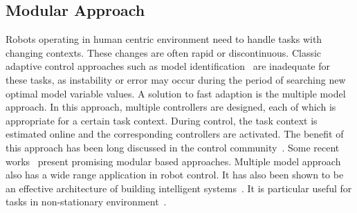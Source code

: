 \subsection{Modular Approach}



Robots operating in human centric environment need to handle tasks with changing contexts. These changes are often rapid or discontinuous. Classic adaptive control approaches such as model identification~\cite{khalil2004modeling} are inadequate for these tasks, as instability or error may occur during the period of searching new optimal model variable values. A solution to fast adaption is the multiple model approach. In this approach, multiple controllers are designed, each of which is appropriate for a certain task context. During control, the task context is estimated online and the corresponding controllers are activated. The benefit of this approach has been long discussed in the control community~\cite{jacobs1991adaptive,narendra1995adaptation,narendra1997adaptive}. Some recent works~\cite{fekri2007robust,kuipers2010multiple} present promising modular based approaches. Multiple model approach also has a wide range application in robot control. It has also been shown to be an effective architecture of building intelligent systems~\cite{bryson2004modular,BrysonMcG12}. It is particular useful for tasks in  non-stationary environment~\cite{petkos2006learning,sugimoto2012emosaic}.



